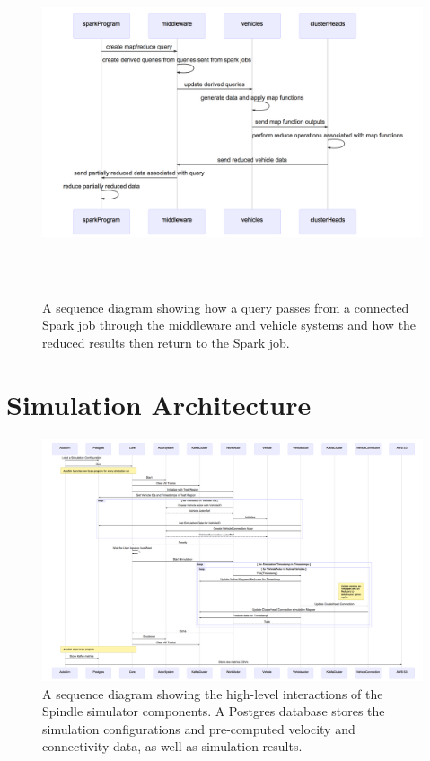 \documentclass{thesis}
\begin{document}
    \begin{figure}
        \centering
        \includegraphics[height=4in, width=6in]{binImages/theoretical-sequence.png}
        \caption{A sequence diagram showing how a query passes from a connected Spark job
        through the middleware and vehicle systems and how the reduced results then return
        to the Spark job.}
        \label{fig:theoretical:sequence}
    \end{figure}


\section{Simulation Architecture}
    \begin{landscape}
        \begin{figure}
            \centering
            \includegraphics[scale=.3]{binImages/simulator-sequence.png}
            \caption{A sequence diagram showing the high-level interactions of
            the Spindle simulator components. A Postgres database stores the
            simulation configurations and pre-computed velocity and connectivity
            data, as well as simulation results.}
        \end{figure}
    \end{landscape}
\end{document}
